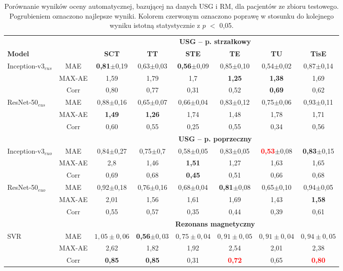 \renewcommand{\arraystretch}{1.2}
\begin{table}[h]
	\scriptsize
	\setlength{\tabcolsep}{1pt}
	\centering
	\caption{Porównanie wyników oceny automatycznej, bazującej na danych USG i RM, dla pacjentów ze zbioru testowego. Pogrubieniem oznaczono najlepsze wyniki. Kolorem czerwonym oznaczono poprawę w stosunku do kolejnego wyniku istotną statystycznie z $p$ $<$ 0,05.}
	\label{tab:USGvsRM-cross-validation}
	\vspace{-0.5cm}
	\begin{tabular}{lc||c|c|c|c|c|c}
		& & \multicolumn{6}{c}{\textbf{USG -- p. strzałkowy}} \\
		\textbf{Model} & & \textbf{SCT} & \textbf{TT} & \textbf{STE} & \textbf{TE} & \textbf{TU} & \textbf{TisE} \\ \hline \hline
		Inception-v3$_{eus}$ & MAE & \textbf{0,81}$\pm$0,19 & 0,63$\pm$0,03 & \textbf{0,56}$\pm$0,09 & 0,85$\pm$0,10 & 0,54$\pm$0,02 & 0,87$\pm$0,14 \\
		& MAX-AE & 1,59 & 1,79 & 1,7 & \textbf{1,25} & \textbf{1,38} & 1,69 \\
		& Corr & 0,80 & 0,77 & 0,31 & 0,52 & \textbf{0,69} & 0,62 \\ \hline
		ResNet-50$_{eus}$ & MAE & 0,88$\pm$0,16 & 0,65$\pm$0,07 & 0,66$\pm$0,04 & 0,83$\pm$0,12 & 0,75$\pm$0,06 & 0,93$\pm$0,11 \\
		& MAX-AE & \textbf{1,49} & \textbf{1,26} & 1,74 & 1,48 & 1,78 & 1,71 \\
		& Corr & 0,60 & 0,55 & 0,25 & 0,55 & 0,34 & 0,56 \\
		\hline \hline
		& & \multicolumn{6}{c}{\textbf{USG -- p. poprzeczny}} \\
		
		Inception-v3$_{euo}$ & MAE & 0,84$\pm$0,27 & 0,75$\pm$0,7 & 0,58$\pm$0,05 & 0,83$\pm$0,05 & \textcolor{red}{\textbf{0,53}}$\pm$0,08 & \textbf{0,83}$\pm$0,15 \\
		& MAX-AE & 2,8 & 1,46 & \textbf{1,51} & 1,27 & 1,63 & 1,65 \\
		& Corr & 0,69 & 0,68 & \textbf{0,45} & 0,51 & 0,66 & 0,68 \\ \hline
		ResNet-50$_{euo}$ & MAE & 0,92$\pm$0,18 & 0,76$\pm$0,16 & 0,68$\pm$0,04 & \textbf{0,81}$\pm$0,08 & 0,65$\pm$0,10 & 0,94$\pm$0,05 \\
		& MAX-AE & 2,01 & 1,56 & 1,61 & 1,69& 1,43 & \textbf{1,58}\\
		& Corr & 0,55 & 0,57 & 0,35 & 0,44 & 0,39 & 0,61 \\ \hline \hline
		& & \multicolumn{6}{c}{\textbf{Rezonans magnetyczny}} \\
		
		SVR & MAE & $1,05\pm0,06$ & \textbf{0,56}$\pm0,03$ & $0,75\pm0,04$ & $0,91\pm0,05$ & $0,91\pm0,04$ & $0,94\pm0,05$\\
		& MAX-AE & 2,62 & 1,82 & 1,92 & 2,54 & 2,01 & 2,38 \\
		& Corr   & \textbf{0,85} & \textbf{0,85} & 0,31 & \textcolor{red}{\textbf{0,72}} & 0,65 & \textcolor{red}{\textbf{0,80}} \\
		
	\end{tabular}
\end{table}
\renewcommand{\arraystretch}{1}

